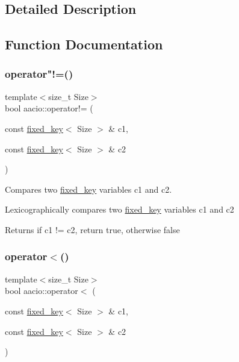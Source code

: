 \subsection{Detailed Description}


\subsection{Function Documentation}
\mbox{\label{group__fixed__key_ga89d7a8005af97542faaa281cec576db7}} 
\subsubsection{\texorpdfstring{operator"!=()}{operator!=()}}
{\footnotesize\ttfamily template$<$size\+\_\+t Size$>$ \\
bool aacio\+::operator!= (\begin{DoxyParamCaption}\item[{const \mbox{\hyperlink{classaacio_1_1fixed__key}{fixed\+\_\+key}}$<$ Size $>$ \&}]{c1,  }\item[{const \mbox{\hyperlink{classaacio_1_1fixed__key}{fixed\+\_\+key}}$<$ Size $>$ \&}]{c2 }\end{DoxyParamCaption})}



Compares two \mbox{\hyperlink{classaacio_1_1fixed__key}{fixed\+\_\+key}} variables c1 and c2. 

Lexicographically compares two \mbox{\hyperlink{classaacio_1_1fixed__key}{fixed\+\_\+key}} variables c1 and c2 \begin{DoxyReturn}{Returns}
if c1 != c2, return true, otherwise false 
\end{DoxyReturn}
\mbox{\label{group__fixed__key_ga7cb9ba21f0abfeb8ba49be15a73dd0eb}} 
\subsubsection{\texorpdfstring{operator$<$()}{operator<()}}
{\footnotesize\ttfamily template$<$size\+\_\+t Size$>$ \\
bool aacio\+::operator$<$ (\begin{DoxyParamCaption}\item[{const \mbox{\hyperlink{classaacio_1_1fixed__key}{fixed\+\_\+key}}$<$ Size $>$ \&}]{c1,  }\item[{const \mbox{\hyperlink{classaacio_1_1fixed__key}{fixed\+\_\+key}}$<$ Size $>$ \&}]{c2 }\end{DoxyParamCaption})}



